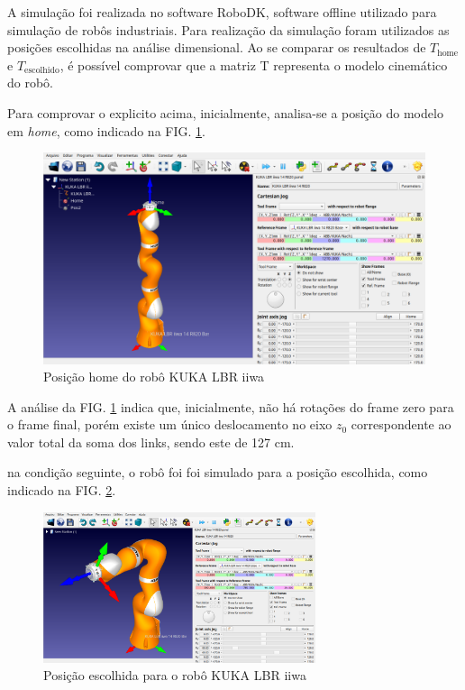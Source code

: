 A simulação foi realizada no software RoboDK, software offline utilizado para simulação de robôs industriais. Para realização da simulação foram utilizados as posições escolhidas na análise dimensional. Ao se comparar os resultados de $T_\mathrm{home}$ e $T_\mathrm{escolhido}$, é possível comprovar que a matriz T representa o modelo cinemático do robô.

Para comprovar o explicito acima, inicialmente, analisa-se a posição do modelo em \textit{home}, como indicado na FIG. \ref{fig:home_simulacao}.

\begin{figure}[ht]
    \centering
    \includegraphics[scale=0.25]{Imagem/home.png}
    \caption{Posição home do robô KUKA LBR iiwa}
    \label{fig:home_simulacao}
\end{figure}

A análise da FIG. \ref{fig:home_simulacao} indica que, inicialmente, não há rotações do frame zero para o frame final, porém existe um único deslocamento no eixo $z_{0}$ correspondente ao valor total da soma dos links, sendo este de 127 cm. 

na condição seguinte, o robô foi foi simulado para a posição escolhida, como indicado na FIG. \ref{fig:escolhida}.

\begin{figure}[h]
    \centering
    \includegraphics[width=8cm]{Imagem/escolhido.png}
    \caption{Posição escolhida para o robô KUKA LBR iiwa}
    \label{fig:escolhida}
\end{figure}


